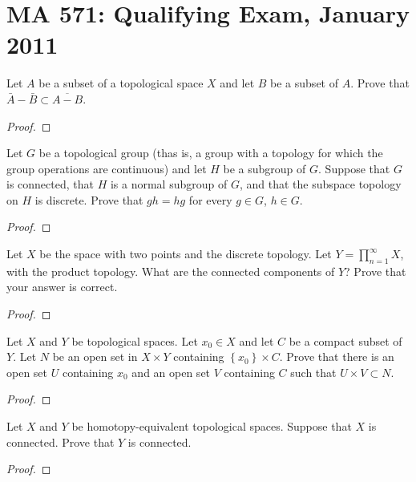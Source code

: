 \section{MA 571: Qualifying Exam, January 2011}
\begin{problem}
Let $A$ be a subset of a topological space $X$ and let $B$ be a subset of
$A$. Prove that $\bar A\minus\bar B\subset\overline{A\minus B}$.
\end{problem}
\begin{proof}
\end{proof}

\begin{problem}
Let $G$ be a topological group (thas is, a group with a topology for which
the group operations are continuous) and let $H$ be a subgroup of
$G$. Suppose that $G$ is connected, that $H$ is a normal subgroup of $G$,
and that the subspace topology on $H$ is discrete. Prove that $gh=hg$ for
every $g\in G$, $h\in G$.
\end{problem}
\begin{proof}
\end{proof}

\begin{problem}
Let $X$ be the space with two points and the discrete topology. Let
$Y=\prod_{n=1}^\infty X$, with the product topology. What are the connected
components of $Y$? Prove that your answer is correct.
\end{problem}
\begin{proof}
\end{proof}

\begin{problem}
Let $X$ and $Y$ be topological spaces. Let $x_0\in X$ and let $C$ be a
compact subset of $Y$. Let $N$ be an open set in $X\times Y$ containing
$\left\{x_0\right\}\times C$. Prove that there is an open set $U$
containing $x_0$ and an open set $V$ containing $C$ such that $U\times
V\subset N$.
\end{problem}
\begin{proof}
\end{proof}

\begin{problem}
Let $X$ and $Y$ be homotopy-equivalent topological spaces. Suppose that $X$
is connected. Prove that $Y$ is connected.
\end{problem}
\begin{proof}
\end{proof}

